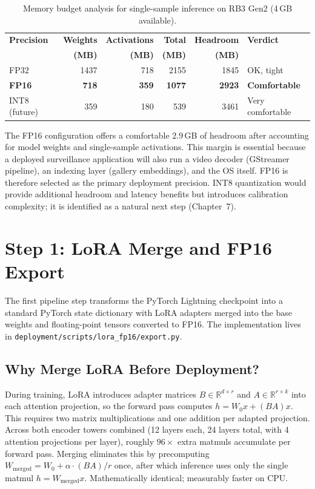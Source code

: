 \documentclass[../main.tex]{subfiles}
\begin{document}
\begin{table}[htbp]
\centering
\caption{Memory budget analysis for single-sample inference on RB3 Gen2 (4\,GB available).}
\label{tab:memory_budget}
\renewcommand{\arraystretch}{1.3}
\begin{tabularx}{\textwidth}{lrrrrX}
\toprule
\textbf{Precision} & \textbf{Weights} & \textbf{Activations} & \textbf{Total} & \textbf{Headroom} & \textbf{Verdict} \\
 & \textbf{(MB)} & \textbf{(MB)} & \textbf{(MB)} & \textbf{(MB)} & \\
\midrule
FP32 & 1437 & 718 & 2155 & 1845 & OK, tight \\
\textbf{FP16} & \textbf{718} & \textbf{359} & \textbf{1077} & \textbf{2923} & \textbf{Comfortable} \\
INT8 (future) & 359 & 180 & 539 & 3461 & Very comfortable \\
\bottomrule
\end{tabularx}
\end{table}

\noindent The FP16 configuration offers a comfortable 2.9\,GB of headroom after accounting for model weights and single-sample activations. This margin is essential because a deployed surveillance application will also run a video decoder (GStreamer pipeline), an indexing layer (gallery embeddings), and the OS itself. FP16 is therefore selected as the primary deployment precision. INT8 quantization would provide additional headroom and latency benefits but introduces calibration complexity; it is identified as a natural next step (Chapter~7).

\section{Step 1: LoRA Merge and FP16 Export}
\label{sec:step1_lora_merge}

\noindent The first pipeline step transforms the PyTorch Lightning checkpoint into a standard PyTorch state dictionary with LoRA adapters merged into the base weights and floating-point tensors converted to FP16. The implementation lives in \texttt{deployment/scripts/lora\_fp16/export.py}.

\subsection{Why Merge LoRA Before Deployment?}

During training, LoRA introduces adapter matrices $B \in \mathbb{R}^{d \times r}$ and $A \in \mathbb{R}^{r \times k}$ into each attention projection, so the forward pass computes $h = W_0 x + (BA) x$. This requires two matrix multiplications and one addition per adapted projection. Across both encoder towers combined (12 layers each, 24 layers total, with 4 attention projections per layer), roughly $96 \times$ extra matmuls accumulate per forward pass. Merging eliminates this by precomputing $W_{\text{merged}} = W_0 + \alpha \cdot (BA) / r$ once, after which inference uses only the single matmul $h = W_{\text{merged}} x$. Mathematically identical; measurably faster on CPU.
\end{document}
